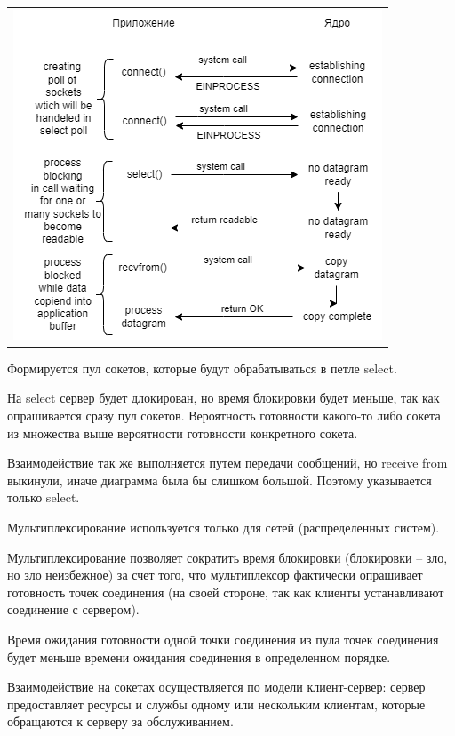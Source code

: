 \begin{table}[H]
  \centering
  \begin{tabular}{p{1\linewidth}}
    \centering
    \includegraphics[width=0.8\linewidth]{./images/1-3.png}
  \end{tabular}
\end{table}
Формируется пул сокетов, которые будут обрабатываться в петле select.

На select сервер будет длокирован, но время блокировки будет меньше, так как опрашивается сразу пул сокетов. Вероятность готовности какого-то либо сокета из множества выше вероятности готовности конкретного сокета.

Взаимодействие так же выполняется путем передачи сообщений, но receive from выкинули, иначе диаграмма была бы слишком большой. Поэтому указывается только select.

Мультиплексирование используется только для сетей (распределенных систем).

Мультиплексирование позволяет сократить время блокировки (блокировки – зло, но зло неизбежное) за счет того, что мультиплексор фактически опрашивает готовность точек соединения (на своей стороне, так как клиенты устанавливают соединение с сервером).

Время ожидания готовности одной точки соединения из пула точек соединения будет меньше времени ожидания соединения в определенном порядке.

Взаимодействие на сокетах осуществляется по модели клиент-сервер: сервер предоставляет ресурсы и службы одному или нескольким клиентам, которые обращаются к серверу за обслуживанием. 

